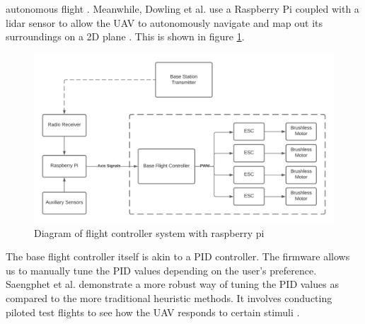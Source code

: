 \documentclass[english]{upeeei}
\begin{document}
autonomous flight \cite{Redtail2017}. Meanwhile, Dowling et al. use a Raspberry Pi coupled with a lidar sensor to allow the UAV
to autonomously navigate and map out its surroundings on a 2D plane \cite{Dowling2018}. This is shown in figure 
\ref{fig:FC_system_diagram}.
\begin{figure}[h]
    \centering
    \includegraphics[scale=0.5]{images/fc_with_rpi.png}
    \caption{Diagram of flight controller system with raspberry pi}
    \label{fig:FC_system_diagram}
\end{figure}
The base flight controller itself is akin to a PID controller. The firmware allows us to manually tune the PID values depending 
on the user's preference. Saengphet et al. demonstrate a more robust way of tuning the PID values as compared to the
more traditional heuristic methods. It involves conducting piloted test flights to see how the UAV responds to certain stimuli
\cite{Tuning2017}.
\end{document}
